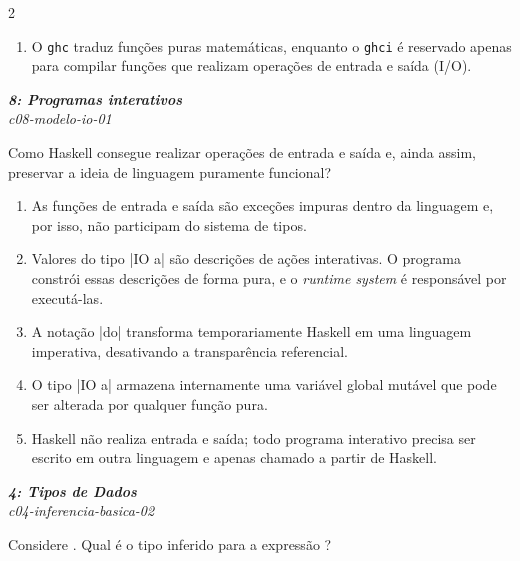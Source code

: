 \documentclass[a4paper,10pt,brazil]{article}
\begin{document}
\begin{multicols}{2}
\begin{enumerate}
  \item O \texttt{ghc} traduz funções puras matemáticas, enquanto o \texttt{ghci} é reservado apenas para compilar funções que realizam operações de entrada e saída (I/O).


\end{enumerate}

\begin{flushright}
  \footnotesize
  \textit{\textbf{8: Programas interativos}}\\
  \textit{c08-modelo-io-01}\\

\end{flushright}
Como Haskell consegue realizar operações de entrada e saída e, ainda assim, preservar a ideia de linguagem puramente funcional?

\begin{enumerate}
  \item As funções de entrada e saída são exceções impuras dentro da linguagem e, por isso, não participam do sistema de tipos.

  \item Valores do tipo \haskellinline|IO a| são descrições de ações interativas. O programa constrói essas descrições de forma pura, e o \emph{runtime system} é responsável por executá-las.

  \item A notação \haskellinline|do| transforma temporariamente Haskell em uma linguagem imperativa, desativando a transparência referencial.

  \item O tipo \haskellinline|IO a| armazena internamente uma variável global mutável que pode ser alterada por qualquer função pura.

  \item Haskell não realiza entrada e saída; todo programa interativo precisa ser escrito em outra linguagem e apenas chamado a partir de Haskell.


\end{enumerate}

\begin{flushright}
  \footnotesize
  \textit{\textbf{4: Tipos de Dados}}\\
  \textit{c04-inferencia-basica-02}\\

\end{flushright}
Considere . Qual é o tipo inferido para a expressão ?


\end{multicols}
\end{document}
